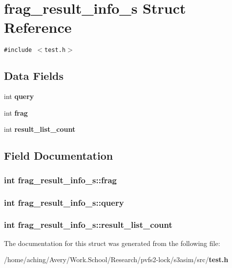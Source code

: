 \section{frag\_\-result\_\-info\_\-s Struct Reference}
\label{structfrag__result__info__s}
{\tt \#include $<$test.h$>$}

\subsection*{Data Fields}
\begin{CompactItemize}
\item 
int \bf{query}
\item 
int \bf{frag}
\item 
int \bf{result\_\-list\_\-count}
\end{CompactItemize}


\subsection{Field Documentation}
\subsubsection{\setlength{\rightskip}{0pt plus 5cm}int \bf{frag\_\-result\_\-info\_\-s::frag}}\label{structfrag__result__info__s_1d5ca39aad82ab513f8031178fab2db8}


\subsubsection{\setlength{\rightskip}{0pt plus 5cm}int \bf{frag\_\-result\_\-info\_\-s::query}}\label{structfrag__result__info__s_1085825749f94ebcdad0730e51e452cc}


\subsubsection{\setlength{\rightskip}{0pt plus 5cm}int \bf{frag\_\-result\_\-info\_\-s::result\_\-list\_\-count}}\label{structfrag__result__info__s_7bebf4082652ea2e480ff3a6e8693332}




The documentation for this struct was generated from the following file:\begin{CompactItemize}
\item 
/home/aching/Avery/Work.School/Research/pvfs2-lock/s3asim/src/\bf{test.h}\end{CompactItemize}
